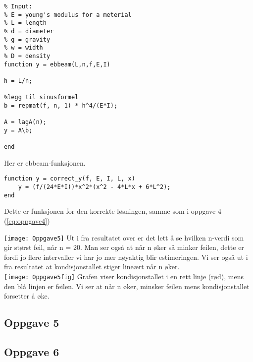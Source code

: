 \begin{lstlisting}
% Input:
% E = young's modulus for a meterial
% L = length
% d = diameter
% g = gravity
% w = width
% D = density
function y = ebbeam(L,n,f,E,I)

h = L/n;

%legg til sinusformel
b = repmat(f, n, 1) * h^4/(E*I);

A = lagA(n);
y = A\b;

end
\end{lstlisting}
Her er ebbeam-funksjonen.

\begin{lstlisting}
function y = correct_y(f, E, I, L, x)
    y = (f/(24*E*I))*x^2*(x^2 - 4*L*x + 6*L^2);
end
\end{lstlisting}
Dette er funksjonen for den korrekte løsningen, samme som i oppgave 4 (\ref{eq:oppgave4})

\texttt{[image: Oppgave5]}
Ut i fra resultatet over er det lett å se hvilken n-verdi som gir størst feil, når n = 20. Man ser også at når n øker så minker feilen, dette er fordi jo flere intervaller vi har jo mer nøyaktig blir estimeringen. Vi ser også ut i fra resultatet at kondisjonstallet stiger lineært når n øker. \\
\texttt{[image: Oppgave5fig]}
Grafen viser kondisjonstallet i en rett linje (rød), mens den blå linjen er feilen. Vi ser at når n øker, minsker feilen mens kondisjonstallet forsetter å øke.

\subsection{Oppgave 5}


\subsection{Oppgave 6}
